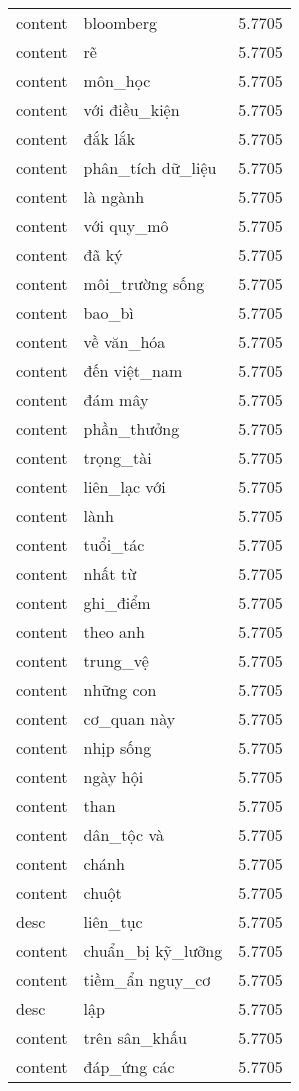 \documentclass{article}
\begin{document}
\begin{tabular}{lll}
content & bloomberg & 5.7705\\
content & rẽ & 5.7705\\
content & môn\_học & 5.7705\\
content & với điều\_kiện & 5.7705\\
content & đắk lắk & 5.7705\\
content & phân\_tích dữ\_liệu & 5.7705\\
content & là ngành & 5.7705\\
content & với quy\_mô & 5.7705\\
content & đã ký & 5.7705\\
content & môi\_trường sống & 5.7705\\
content & bao\_bì & 5.7705\\
content & về văn\_hóa & 5.7705\\
content & đến việt\_nam & 5.7705\\
content & đám mây & 5.7705\\
content & phần\_thưởng & 5.7705\\
content & trọng\_tài & 5.7705\\
content & liên\_lạc với & 5.7705\\
content & lành & 5.7705\\
content & tuổi\_tác & 5.7705\\
content & nhất từ & 5.7705\\
content & ghi\_điểm & 5.7705\\
content & theo anh & 5.7705\\
content & trung\_vệ & 5.7705\\
content & những con & 5.7705\\
content & cơ\_quan này & 5.7705\\
content & nhịp sống & 5.7705\\
content & ngày hội & 5.7705\\
content & than & 5.7705\\
content & dân\_tộc và & 5.7705\\
content & chánh & 5.7705\\
content & chuột & 5.7705\\
desc & liên\_tục & 5.7705\\
content & chuẩn\_bị kỹ\_lưỡng & 5.7705\\
content & tiềm\_ẩn nguy\_cơ & 5.7705\\
desc & lập & 5.7705\\
content & trên sân\_khấu & 5.7705\\
content & đáp\_ứng các & 5.7705\\

\end{tabular}
\end{document}

